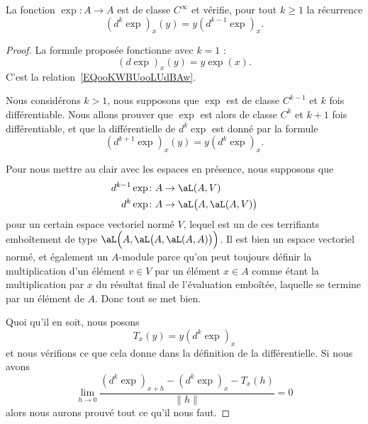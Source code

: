 \begin{proposition}      \label{PROPooTBDAooQouzSk}
    La fonction \( \exp\colon A\to A\) est de classe \(  C^{\infty}\) et vérifie, pour tout \( k\geq 1\) la récurrence
    \begin{equation}
        (d^k\exp)_x(y)=y(d^{k-1}\exp)_x.
    \end{equation}
\end{proposition}

\begin{proof}
    La formule proposée fonctionne avec \( k=1\) :
    \begin{equation}
        (d\exp)_x(y)=y\exp(x).
    \end{equation}
    C'est la relation~\ref{EQooKWBUooLUdBAw}.

    Nous considérons \( k>1\), nous supposons que \( \exp\) est de classe \( C^{k-1}\) et \( k\) fois différentiable. Nous allons prouver que \( \exp\) est alors de classe \( C^k\) et \( k+1\) fois différentiable, et que la différentielle de \( d^k\exp\) est donné par la formule
    \begin{equation}
        (d^{k+1}\exp)_x(y)=y(d^{k}\exp)_x.
    \end{equation}

    Pour nous mettre au clair avec les espaces en présence, nous supposons que
    \begin{subequations}
        \begin{align}
            d^{k-1}\exp&\colon A\to \aL(A,V)\\
            d^{k}\exp&\colon A\to \aL\big( A,\aL(A,V) \big)
        \end{align}
    \end{subequations}
    pour un certain espace vectoriel normé \( V\), lequel est un de ces terrifiants emboîtement de type \( \aL\Big( A,\aL\big( A,\aL(A,A) \big) \Big)\). Il est bien un espace vectoriel normé, et également un \( A\)-module parce qu'on peut toujours définir la multiplication d'un élément \( v\in V\) par un élément \(x\in A\) comme étant la multiplication par \( x\) du résultat final de l'évaluation emboîtée, laquelle se termine par un élément de \( A\). Donc tout se met bien.

    Quoi qu'il en soit, nous posons
    \begin{equation}
        T_x(y)=y(d^{k}\exp)_x
    \end{equation}
    et nous vérifions ce que cela donne dans la définition de la différentielle. Si nous avons
    \begin{equation}
        \lim_{h\to 0} \frac{ (d^k\exp)_{x+h}-(d^k\exp)_x-T_x(h) }{ \| h \| }=0
    \end{equation}
    alors nous aurons prouvé tout ce qu'il nous faut.


\end{proof}
